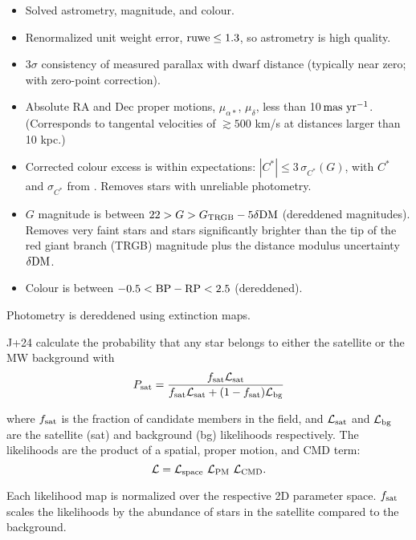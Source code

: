 \begin{itemize}
\tightlist
\item
  Solved astrometry, magnitude, and colour.
\item
  Renormalized unit weight error, \({\rm ruwe} \leq 1.3\), so astrometry
  is high quality.
\item
  3\(\sigma\) consistency of measured parallax with dwarf distance
  (typically near zero; with \citet{lindegren+2021} zero-point
  correction).
\item
  Absolute RA and Dec proper motions, \(\mu_{\alpha*}\), \(\mu_\delta\),
  less than 10\(\,{\rm mas\ yr^{-1}}\). (Corresponds to tangental
  velocities of \(\gtrsim 500\) km/s at distances larger than 10 kpc.)
\item
  Corrected colour excess is within expectations:
  \(|C^*| \leq 3\,\sigma_{C^*}(G)\), with \(C^*\) and \(\sigma_{C^*}\)
  from \citet{riello+2021}. Removes stars with unreliable photometry.
\item
  \(G\) magnitude is between \(22 > G > G_{\rm TRGB} - 5\delta\rm {DM}\)
  (dereddened magnitudes). Removes very faint stars and stars
  significantly brighter than the tip of the red giant branch (TRGB)
  magnitude plus the distance modulus uncertainty \(\delta {\rm DM}\).
\item
  Colour is between \(-0.5 < {\rm BP - RP} <  2.5\) (dereddened).
\end{itemize}

Photometry is dereddened using \citet{schlegel+finkbeiner+davis1998}
extinction maps.

J+24 calculate the probability that any star belongs to either the
satellite or the MW background with \begin{equation}
P_{\rm sat} = \frac{f_{\rm sat}{\cal L}_{\rm sat}}{f_{\rm sat}{\cal L}_{\rm sat} + (1-f_{\rm sat}){\cal L}_{\rm bg}}
\end{equation}

where \(f_{\rm sat}\) is the fraction of candidate members in the field,
and \({\cal L}_{\rm sat}\) and \({\cal L}_{\rm bg}\) are the satellite
(sat) and background (bg) likelihoods respectively. The likelihoods are
the product of a spatial, proper motion, and CMD term: \begin{equation}
{\cal L} = {\cal L}_{\rm space}\ {\cal L}_{\rm PM}\ {\cal L}_{\rm CMD}.
\end{equation}

Each likelihood map is normalized over the respective 2D parameter
space. \(f_{\rm sat}\) scales the likelihoods by the abundance of stars
in the satellite compared to the background.

